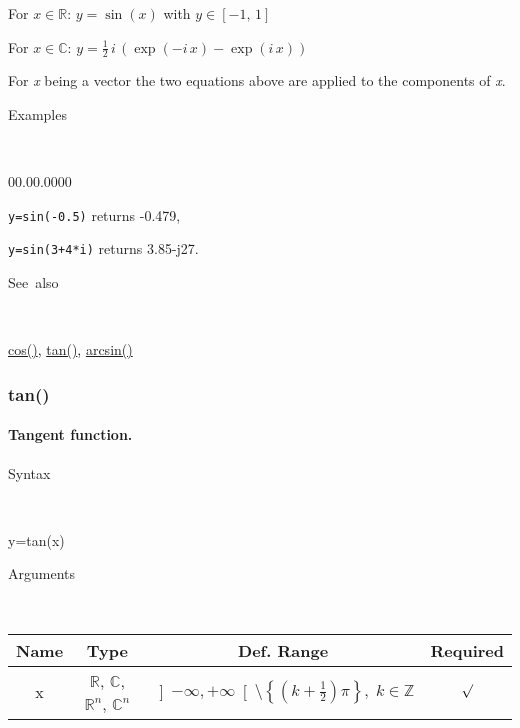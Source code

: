\medskip{}
For $x\in\mathbb{R}$: $y=\sin\left(x\right)$ with $y\in\left[-1,\,1\right]$
\medskip{}

For $x\in\mathbb{C}$: $y=\frac{1}{2}\, i\,\left(\exp\left(-i\, x\right)-\exp\left(i\, x\right)\right)$
\medskip{}

\noindent For \textit{x} being a vector the two equations above are
applied to the components of \textit{x}.

\begin{description}
\item [Examples]~
\end{description}
\begin{lyxlist}{00.00.0000}
\item [\texttt{y=sin(-0.5)}]returns -0.479,
\item [\texttt{y=sin(3+4{*}i)}]returns 3.85-j27.
\end{lyxlist}
\begin{description}
\item [See~also]~
\end{description}
\textcolor{blue}{\hyperlink{cos}{cos()}}\textcolor{black}{,} \textcolor{blue}{\hyperlink{tan}{tan()}}\textcolor{black}{,}
\textcolor{blue}{\hyperlink{arcsin}{arcsin()}}


\newpage
\subsubsection*{\hypertarget{tan}{}{\Large tan()}}


\paragraph{\label{par:Tangent}Tangent function.}

\begin{description}
\item [Syntax]~
\end{description}
y=tan(x)

\begin{description}
\item [Arguments]~
\end{description}
\begin{tabular}{|c|c|c|c|}
\hline 
Name&
Type&
Def. Range&
Required\tabularnewline
\hline
\hline 
x&
$\mathbb{R}$, $\mathbb{C}$, $\mathbb{R}^{n}$, $\mathbb{C}^{n}$&
$\left]-\infty,+\infty\right[\setminus\left\{ \left(k+\frac{1}{2}\right)\pi\right\} ,\; k\in\mathbb{Z}$&
$\surd$\tabularnewline
\hline
\end{tabular}

